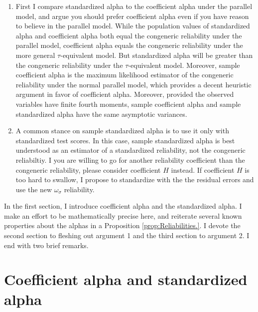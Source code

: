 \documentclass{article}
\theoremstyle{plain}
\theoremstyle{plain}
\theoremstyle{definition}
\theoremstyle{remark}
\theoremstyle{definition}
\theoremstyle{plain}
\theoremstyle{plain}
\theoremstyle{definition}
\begin{document}
\begin{enumerate}[label=\arabic*.]
\item First I compare standardized alpha to the coefficient alpha under the parallel model, and argue you should prefer coefficient alpha even if you have reason to believe in the parallel model. While the population values of standardized alpha and coefficient alpha both equal the congeneric reliability under the parallel model, coefficient alpha equals the congeneric reliability under the more general $\tau$-equivalent model. But standardized alpha will be greater than the congeneric reliability under the $\tau$-equivalent model. Moreover, sample coefficient alpha is the maximum likelihood estimator of the congeneric reliability under the normal parallel model, which provides a decent heuristic argument in favor of coefficient alpha. Moreover, provided the observed variables have finite fourth moments, sample coefficient alpha and sample standardized alpha have the same asymptotic variances. 

\item A common stance on sample standardized alpha is to use it only with standardized test scores. In this case, sample standardized alpha is best understood as an estimator of a standardized reliability, not the congeneric reliabiltiy. I you are willing to go for another reliability coefficient than the congeneric reliability, please consider coefficient $H$ instead. If coefficient $H$ is too hard to swallow, I propose to standardize with the the residual errors and use the new $\omega_\sigma$ reliability.
\end{enumerate}

In the first section, I introduce coefficient alpha and the standardized alpha. I make an effort to be mathematically precise here, and reiterate several known properties about the alphas in a Proposition \ref{prop:Reliabilities.}. I devote the second section to fleshing out argument 1 and the third section to argument 2. I end with two brief remarks.
\section{Coefficient alpha and standardized alpha}
\end{document}
